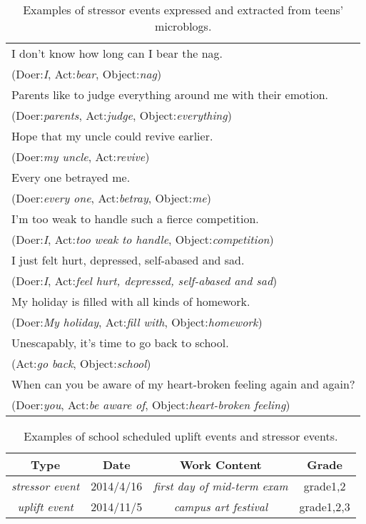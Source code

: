\begin{table}
\begin{center}
\caption{Examples of stressor events expressed and extracted from teens' microblogs.}
\begin{tabular}{l} \hline \rowcolor{gray!40}
I don't know how long can I bear the nag.\\ \rowcolor{gray!40}
(Doer:\emph{I}, Act:\emph{bear}, Object:\emph{nag})\\ %
Parents like to judge everything around me with their emotion.
\\(Doer:\emph{parents}, Act:\emph{judge}, Object:\emph{everything})\\ \rowcolor{gray!40}%
Hope that my uncle could revive earlier.\\ \rowcolor{gray!40}
(Doer:\emph{my uncle}, Act:\emph{revive})\\%
Every one betrayed me.
\\(Doer:\emph{every one}, Act:\emph{betray}, Object:\emph{me})\\ \rowcolor{gray!40} %
I'm too weak to handle such a fierce competition.\\ \rowcolor{gray!40}
(Doer:\emph{I}, Act:\emph{too weak to handle}, Object:\emph{competition})\\%
I just felt hurt, depressed, self-abased and sad.
\\(Doer:\emph{I}, Act:\emph{feel hurt, depressed, self-abased and sad})\\ \rowcolor{gray!40}%
My holiday is filled with all kinds of homework.\\ \rowcolor{gray!40}
(Doer:\emph{My holiday}, Act:\emph{fill with}, Object:\emph{homework})\\ %
Unescapably, it's time to go back to school.
\\(Act:\emph{go back}, Object:\emph{school})\\ \rowcolor{gray!40} %
When can you be aware of my heart-broken feeling again and again?\\ \rowcolor{gray!40}
(Doer:\emph{you}, Act:\emph{be aware of}, Object:\emph{heart-broken feeling})\\ \hline
\end{tabular}
\label{tab:stressors}
\end{center}
\end{table}

\begin{table}
\centering
\caption{Examples of school scheduled uplift events and stressor events.}
\label{tab:example}
\begin{tabular}{cccc}
\toprule
Type & Date	& Work Content	& Grade	\\
\midrule
\emph{stressor event} & 2014/4/16 & \emph{first day of mid-term exam} & grade1,2\\
\emph{uplift event} & 2014/11/5 & \emph{campus art festival} & grade1,2,3\\
\bottomrule
\end{tabular}
\end{table}

